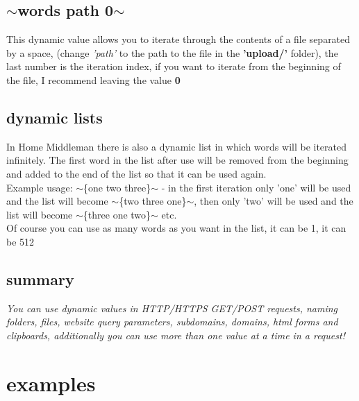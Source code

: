 \documentclass{article}
\begin{document}
\subsection{$\sim$words path 0$\sim$}
This dynamic value allows you to iterate through the contents of a file separated by a space, (change \textit{'path'} to the path to the file in the \textbf{'upload/'} folder), the last number is the iteration index, if you want to iterate from the beginning of the file, I recommend leaving the value \textbf{0}
\subsection{dynamic lists}
In Home Middleman there is also a dynamic list in which words will be iterated infinitely. The first word in the list after use will be removed from the beginning and added to the end of the list so that it can be used again.\\
Example usage: $\sim$\{one two three\}$\sim$ - in the first iteration only 'one' will be used and the list will become $\sim$\{two three one\}$\sim$, then only 'two' will be used and the list will become $\sim$\{three one two\}$\sim$ etc.\\
Of course you can use as many words as you want in the list, it can be 1, it can be 512
\subsection{summary}
\textit{You can use dynamic values in HTTP/HTTPS GET/POST requests, naming folders, files, website query parameters, subdomains, domains, html forms and clipboards, additionally you can use more than one value at a time in a request!}
\section{examples}
\end{document}

